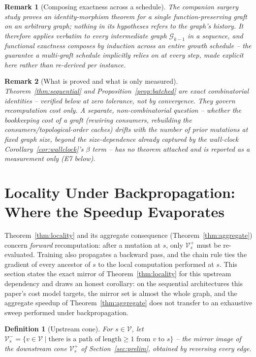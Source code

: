 \documentclass[11pt,a4paper]{article}
\newtheorem{definition}{Definition}
\newtheorem{remark}{Remark}
\newcommand{\G}{\mathcal{G}}
\newcommand{\V}{\mathcal{V}}
\begin{document}
\begin{remark}[Composing exactness across a schedule]
The companion surgery study \cite{surgery} proves an identity-morphism theorem for a single function-preserving
graft on an arbitrary graph; nothing in its hypotheses refers to the graph's history. It therefore
applies verbatim to every intermediate graph $\G_{k-1}$ in a sequence, and functional exactness
composes by induction across an entire growth schedule -- the guarantee a multi-graft schedule
implicitly relies on at every step, made explicit here rather than re-derived per instance.
\end{remark}

\begin{remark}[What is proved and what is only measured]
Theorem~\ref{thm:sequential} and Proposition~\ref{prop:batched} are exact combinatorial
identities -- verified below at zero tolerance, not by convergence. They govern
\emph{recomputation} cost only. A separate, non-combinatorial question -- whether the
\emph{bookkeeping} cost of a graft (rewiring consumers, rebuilding the consumers/topological-order
caches) drifts with the number of prior mutations at fixed graph size, beyond the size-dependence
already captured by the wall-clock Corollary~\ref{cor:wallclock}'s $\beta$ term -- has no theorem
attached and is reported as a measurement only (E7 below).
\end{remark}

\section{Locality Under Backpropagation: Where the Speedup Evaporates}
\label{sec:backward-locality}

Theorem~\ref{thm:locality} and its aggregate consequence (Theorem~\ref{thm:aggregate}) concern
\emph{forward} recomputation: after a mutation at $s$, only $\V_s^+$ must be re-evaluated.
Training also propagates a backward pass, and the chain rule ties the gradient of every ancestor
of $s$ to the local computation performed at $s$. This section states the exact mirror of
Theorem~\ref{thm:locality} for this upstream dependency and draws an honest corollary: on the
sequential architectures this paper's cost model targets, the mirror set is almost the whole
graph, and the aggregate speedup of Theorem~\ref{thm:aggregate} does not transfer to an
exhaustive sweep performed under backpropagation.

\begin{definition}[Upstream cone]
For $s\in\V$, let $\V_s^{-} = \{v\in\V \mid \text{there is a path of length}\ge1\text{ from }v
\text{ to } s\}$ -- the mirror image of the downstream cone $\V_s^+$ of Section~\ref{sec:prelim},
obtained by reversing every edge.
\end{definition}
\end{document}
